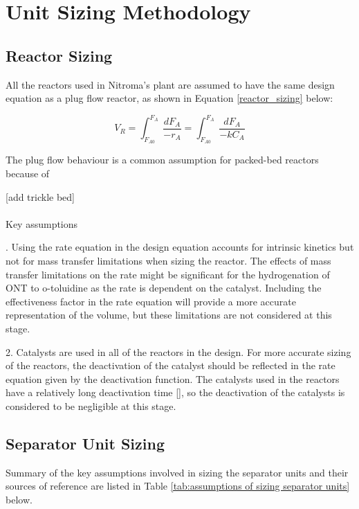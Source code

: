 \section{Unit Sizing Methodology}
\label{app:sizing}
\subsection{Reactor Sizing}

All the reactors used in Nitroma's plant are assumed to have the same design equation as a plug flow reactor, as shown in Equation \ref{reactor_sizing} below:

\begin{equation}
    V_R = \int_{F_{A0}}^{F_{A}} \frac{dF_A}{-r_A} = \int_{F_{A0}}^{F_{A}} \frac{dF_A}{-kC_A}
    \label{reactor_sizing}
\end{equation}

The plug flow behaviour is a common assumption for packed-bed reactors because of \cite{froment_chemical_nodate}

[add trickle bed]
\paragraph{}{Key assumptions}
 
.  Using the rate equation in the design equation accounts for intrinsic kinetics but not for mass transfer limitations when sizing the reactor. The effects of mass transfer limitations on the rate might be significant for the hydrogenation of ONT to o-toluidine as the rate is dependent on the catalyst. Including the effectiveness factor in the rate equation will provide a more accurate representation of the volume, but these limitations are not considered at this stage.

2.  Catalysts are used in all of the reactors in the design. For more accurate sizing of the reactors, the deactivation of the catalyst should be reflected in the rate equation given by the deactivation function. The catalysts used in the reactors have a relatively long deactivation time [], so the deactivation of the catalysts is considered to be negligible at this stage. 

\subsection{Separator Unit Sizing}

\noindent Summary of the key assumptions involved in sizing the separator units and their sources of reference are listed in Table \ref{tab:assumptions of sizing separator units} below. 

